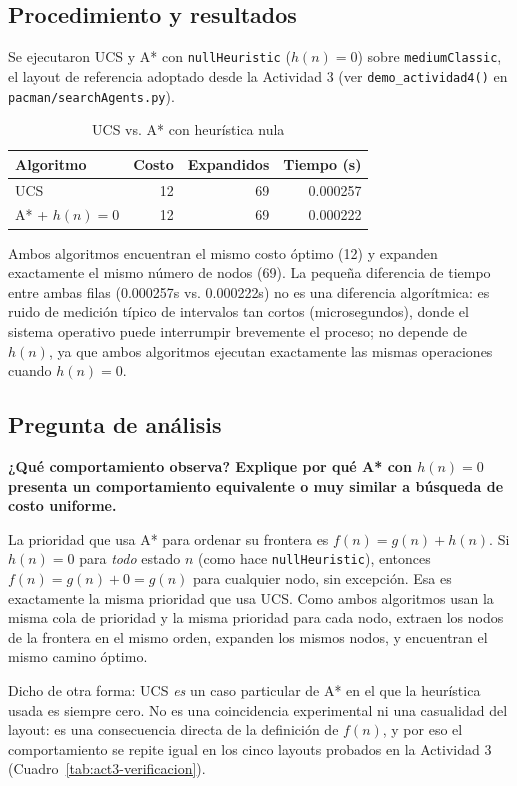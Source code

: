 \subsection{Procedimiento y resultados}

Se ejecutaron UCS y A* con \texttt{nullHeuristic} ($h(n)=0$) sobre \texttt{mediumClassic}, el
layout de referencia adoptado desde la Actividad 3
(ver \texttt{demo\_actividad4()} en \texttt{pacman/searchAgents.py}).

\begin{table}[H]
\centering
\caption{UCS vs. A* con heurística nula}
\label{tab:act4-comparacion}
\begin{tabular}{lrrr}
\toprule
\textbf{Algoritmo} & \textbf{Costo} & \textbf{Expandidos} & \textbf{Tiempo (s)} \\
\midrule
UCS & 12 & 69 & 0.000257 \\
A* + $h(n)=0$ & 12 & 69 & 0.000222 \\
\bottomrule
\end{tabular}
\end{table}

Ambos algoritmos encuentran el mismo costo óptimo (12) y expanden exactamente el mismo número de
nodos (69). La pequeña diferencia de tiempo entre ambas filas (0.000257s vs. 0.000222s) no es una
diferencia algorítmica: es ruido de medición típico de intervalos tan cortos (microsegundos),
donde el sistema operativo puede interrumpir brevemente el proceso; no depende de $h(n)$, ya que
ambos algoritmos ejecutan exactamente las mismas operaciones cuando $h(n)=0$.

\subsection{Pregunta de análisis}

\textbf{¿Qué comportamiento observa? Explique por qué A* con $h(n)=0$ presenta un comportamiento
equivalente o muy similar a búsqueda de costo uniforme.}

La prioridad que usa A* para ordenar su frontera es $f(n) = g(n) + h(n)$. Si $h(n) = 0$ para
\emph{todo} estado $n$ (como hace \texttt{nullHeuristic}), entonces $f(n) = g(n) + 0 = g(n)$ para
cualquier nodo, sin excepción. Esa es exactamente la misma prioridad que usa UCS. Como ambos
algoritmos usan la misma cola de prioridad y la misma prioridad para cada nodo, extraen los nodos
de la frontera en el mismo orden, expanden los mismos nodos, y encuentran el mismo camino óptimo.

Dicho de otra forma: UCS \emph{es} un caso particular de A* en el que la heurística usada es
siempre cero. No es una coincidencia experimental ni una casualidad del layout: es una consecuencia
directa de la definición de $f(n)$, y por eso el comportamiento se repite igual en los cinco
layouts probados en la Actividad 3 (Cuadro~\ref{tab:act3-verificacion}).
